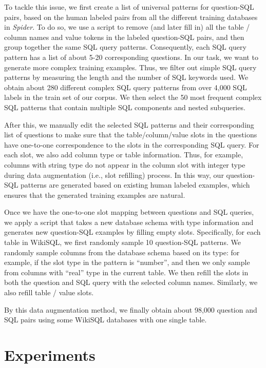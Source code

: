 \documentclass[11pt,a4paper]{article}
\begin{document}
To tackle this issue, we first create a list of universal patterns for question-SQL pairs, based on the human labeled pairs from all the different training databases in \textit{Spider}.
To do so, we use a script to remove (and later fill in) all the table \!/\! column names and value tokens in the labeled question-SQL pairs, and then group together the same SQL query patterns.
Consequently, each SQL query pattern has a list of about 5-20 corresponding questions.
In our task, we want to generate more complex training examples.
Thus, we filter out simple SQL query patterns by measuring the length and the number of SQL keywords used.
We obtain about 280 different complex SQL query patterns from over 4,000 SQL labels in the train set of our corpus. We then select the 50 most frequent complex SQL patterns that contain multiple SQL components and nested subqueries. 

After this, we manually edit the selected SQL patterns and their corresponding list of questions to make sure that the table/column/value slots in the questions have one-to-one correspondence to the slots in the corresponding SQL query. For each slot, we also add column type or table information. Thus, for example, columns with string type do not appear in the column slot with integer type during data augmentation (i.e., slot refilling) process.
In this way, our question-SQL patterns are generated based on existing human labeled examples, which ensures that the generated training examples are natural.


Once we have the one-to-one slot mapping between questions and SQL queries, we apply a script that takes a new database schema with type information and generates new question-SQL examples by filling empty slots.
Specifically, for each table in WikiSQL, we first randomly sample 10 question-SQL patterns.
We randomly sample columns from the database schema based on its type: for example, if the slot type in the pattern is ``number'', and then we only sample from columns with ``real'' type in the current table.
We then refill the slots in both the question and SQL query with the selected column names.
Similarly, we also refill table \!/\! value slots.

By this data augmentation method, we finally obtain about 98,000 question and SQL pairs using some WikiSQL databases with one single table.


\section{Experiments}
\end{document}
